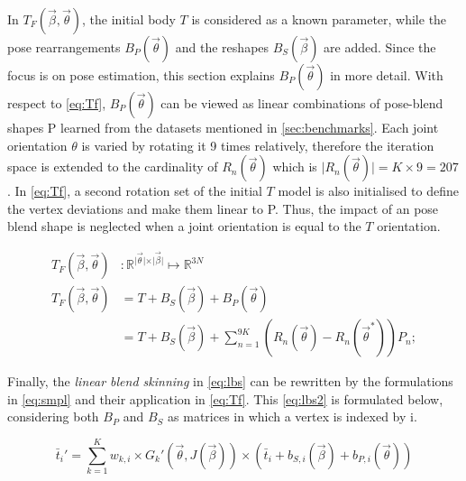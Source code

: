 In $T_{F}(\vec{\beta},\vec{\theta})$, the initial body $T$ is considered as a known parameter, while the pose rearrangements $B_{P}(\vec{\theta})$ and the reshapes $B_{S}(\vec{\beta})$ are added. Since the focus is on pose estimation, this section explains $B_{P}(\vec{\theta})$ in more detail. With respect to \autoref{eq:Tf}, $B_{P}(\vec{\theta})$ can be viewed as linear combinations of pose-blend shapes P learned from the datasets mentioned in \autoref{sec:benchmarks}. Each joint orientation $\theta$ is varied by rotating it 9 times relatively, therefore the iteration space is extended to the cardinality of $R_{n}(\vec{\theta})$ which is $\vert R_{n}(\vec{\theta}) \vert = K \times 9 = 207$. In \autoref{eq:Tf}, a second rotation set of the initial $T$ model is also initialised to define the vertex deviations and make them linear to P. Thus, the impact of an pose blend shape is neglected when a joint orientation is equal to the $T$ orientation.

\begin{equation}
\label{eq:Tf}
	\begin{split}
		T_{F}(\vec{\beta},\vec{\theta})&: \mathbb{R}^{\vert \vec{\theta} 			\vert \times \vert \vec{\beta} \vert} \mapsto \mathbb{R}^{3N} \\
		T_{F}(\vec{\beta},\vec{\theta}) &= T + B_{S}(\vec{\beta}) + B_{P}				(\vec{\theta}) \\
		&= T + B_{S}(\vec{\beta}) + \sum_{n=1}^{9K} (R_{n}(\vec{\theta}) - 				R_{n}(\vec{\theta}^{*}))P_{n};
	\end{split}
\end{equation}

Finally, the \emph{linear blend skinning} in \autoref{eq:lbs} can be rewritten by the formulations in \autoref{eq:smpl} and their application in \autoref{eq:Tf}. This \autoref{eq:lbs2} is formulated below, considering both $B_{P}$ and $B_{S}$ as matrices in which a vertex is indexed by i.

\begin{equation}
\label{eq:lbs2}
\bar{t}_{i}' = \sum_{k=1}^{K} w_{k,i} \times G_{k}'(\vec{\theta},J(\vec{\beta})) \times (\bar{t}_{i} + b_{S,i}(\vec{\beta}) +b_{P,i}(\vec{\theta}))
\end{equation}


\cite{smpl}

